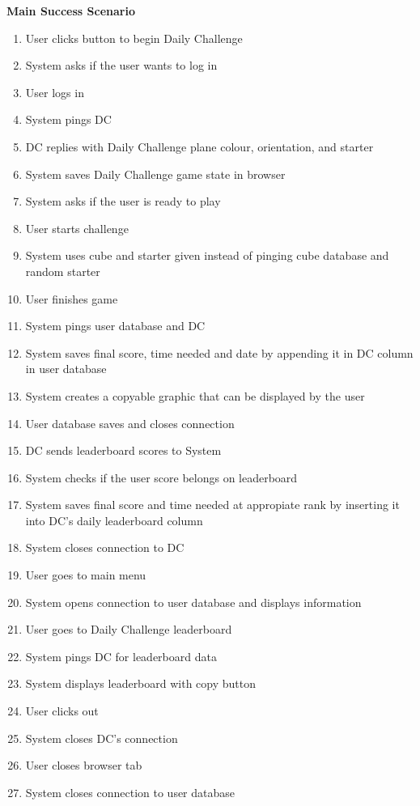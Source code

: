 \documentclass[12pt]{article}
\begin{document}
\textbf{Main Success Scenario}
\begin{enumerate}
\item User clicks button to begin Daily Challenge
\item System asks if the user wants to log in
\item User logs in
\item System pings DC
\item DC replies with Daily Challenge  plane colour, orientation, and starter
\item System saves Daily Challenge game state in browser
\item System asks if the user is ready to play
\item User starts challenge
\item System uses cube and starter given instead of pinging cube database and random starter
\item User finishes game
\item System pings user database and DC
\item System saves final score, time needed and date by appending it in DC column in user database
\item System creates a copyable graphic that can be displayed by the user
\item User database saves and closes connection
\item DC sends leaderboard scores to System
\item System checks if the user score belongs on leaderboard
\item System saves final score and time needed at appropiate rank by inserting it into DC's daily leaderboard column
\item System closes connection to DC
\item User goes to main menu
\item System opens connection to user database and displays information
\item User goes to Daily Challenge leaderboard
\item System pings DC for leaderboard data
\item System displays leaderboard with copy button
\item User clicks out
\item System closes DC's connection
\item User closes browser tab
\item System closes connection to user database
\end{enumerate}
\end{document}
